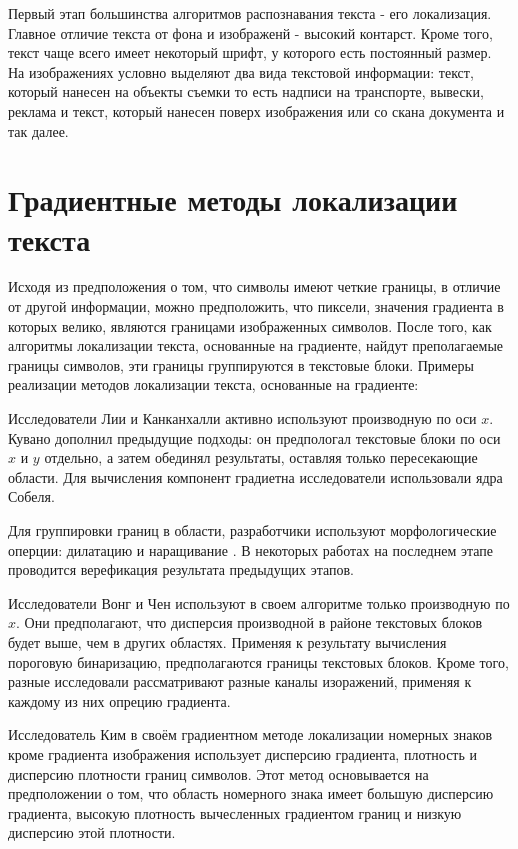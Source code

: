 \documentclass[oneside,final,14pt]{extreport}
\begin{document}
Первый   этап большинства алгоритмов распознавания текста - его локализация. Главное отличие текста от фона и изображенй - высокий контарст. Кроме того, текст чаще всего имеет некоторый шрифт, у которого есть постоянный размер. На изображениях  условно выделяют два вида текстовой информации: текст, который нанесен на объекты съемки то есть надписи на транспорте, вывески, реклама и текст, который нанесен поверх изображения или со скана документа и так далее. 

\section{Градиентные методы локализации текста}

Исходя из предположения о том, что символы имеют четкие границы, в отличие от другой информации, можно предположить, что пиксели, значения градиента в которых велико, являются границами изображенных символов. После того, как алгоритмы локализации текста, основанные на градиенте, найдут преполагаемые границы символов, эти границы группируются в текстовые блоки. Примеры реализации методов локализации текста, основанные на градиенте: 

Исследователи Лии и Канканхалли активно используют производную по оси $x$. Кувано дополнил предыдущие подходы: он предпологал текстовые блоки по оси $x$ и $y$ отдельно, а затем обединял результаты, оставляя только пересекающие области. Для вычисления компонент градиетна исследователи использовали ядра Собеля. 

Для группировки границ в области, разработчики используют морфологические оперции: дилатацию и наращивание \cite{Dup:coursache}. В некоторых работах на последнем этапе проводится верефикация результата предыдущих этапов.

Исследователи Вонг и Чен используют в своем алгоритме только производную по $x$. Они предполагают, что дисперсия производной в районе текстовых блоков будет выше, чем в других областях.  Применяя к результату вычисления пороговую бинаризацию, предполагаются границы текстовых блоков.  Кроме того, разные исследовали рассматривают разные каналы изоражений, применяя к каждому из них опрецию градиента.

Исследователь Ким в своём градиентном методе локализации номерных знаков кроме градиента изображения использует дисперсию градиента, плотность и дисперсию плотности границ символов. Этот метод основывается на предположении о том, что область номерного знака имеет большую дисперсию градиента, высокую плотность вычесленных градиентом границ и низкую дисперсию этой плотности.
\end{document}
